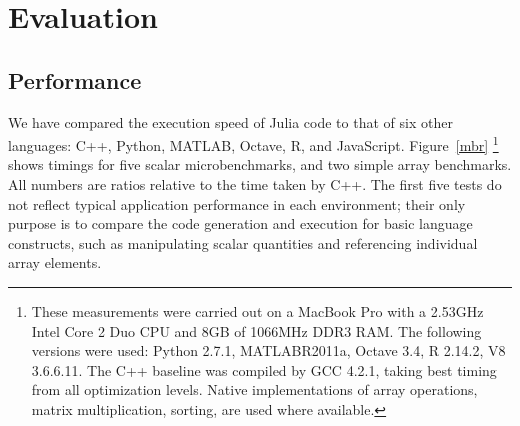\documentclass[9pt]{sigplanconf}
\newcommand{\Matlab}{MATLAB\textsuperscript{\tiny\textregistered}}
\begin{document}
\section{Evaluation}

\subsection{Performance}

We have compared the execution speed of Julia code to that of six other
languages: C++, Python, \Matlab, Octave, R, and JavaScript.
Figure~\ref{mbr}
\footnote{
  These measurements were carried out on a MacBook Pro with a 2.53GHz
  Intel Core 2 Duo CPU and 8GB of 1066MHz DDR3 RAM. The following
  versions were used: Python 2.7.1, \Matlab R2011a,
  Octave 3.4, R 2.14.2, V8 3.6.6.11.  The C++ baseline was compiled by
  GCC 4.2.1, taking best timing from all optimization levels.
  Native implementations of array operations, matrix
  multiplication, sorting, are used where available.
}
shows timings for five scalar microbenchmarks, and two
simple array benchmarks. All numbers are ratios relative to
the time taken by C++. The first five tests do not
reflect typical application performance in each environment; their only
purpose is to compare the code generation and execution for basic language
constructs, such as manipulating scalar quantities and referencing individual
array elements.
\end{document}
